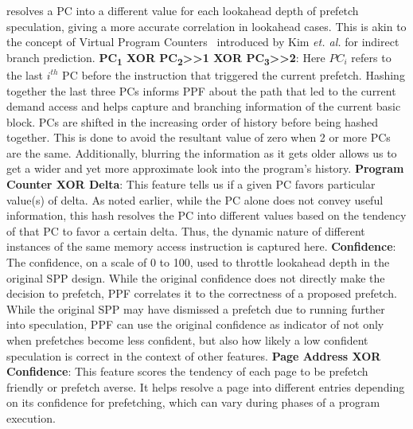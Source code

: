 resolves a PC into a different value for each lookahead depth of
prefetch speculation, giving a more accurate correlation in lookahead
cases.  This is akin to the concept of Virtual Program
Counters~\cite{VPC} introduced by Kim \textit{et. al.} for indirect
branch prediction.
%
\newline
\newline
\noindent \textbf{PC\textsubscript{1} XOR PC\textsubscript{2}>>1 XOR
  PC\textsubscript{3}>>2}: Here $PC_i$ refers to the last $i^{th}$ PC
before the instruction that triggered the current prefetch.  Hashing
together the last three PCs informs PPF about the path that led to the
current demand access and helps capture and branching information of
the current basic block.  PCs are shifted in the increasing order of
history before being hashed together. This is done to avoid the
resultant value of zero when 2 or more PCs are the same. Additionally,
blurring the information as it gets older allows us to get a wider and
yet more approximate look into the program's history.
%
\newline
\newline
\noindent \textbf{Program Counter XOR Delta}: This feature tells us if
a given PC favors particular value(s) of delta.  As noted earlier,
while the PC alone does not convey useful information, this hash
resolves the PC into different values based on the tendency of that PC
to favor a certain delta.  Thus, the dynamic nature of different
instances of the same memory access instruction is captured here.
%
\newline
\newline
\noindent \textbf{Confidence}: The confidence, on a scale of 0 to 100,
used to throttle lookahead depth in the original SPP design.  While
the original confidence does not directly make the decision to
prefetch, PPF correlates it to the correctness of a proposed prefetch.
While the original SPP may have dismissed a prefetch due to running
further into speculation, PPF can use the original confidence as
indicator of not only when prefetches become less confident, but also
how likely a low confident speculation is correct in the context of
other features.
%
\newline
\newline
\noindent \textbf{Page Address XOR Confidence}: This feature scores
the tendency of each page to be prefetch friendly or prefetch averse.
It helps resolve a page into different entries depending on its
confidence for prefetching, which can vary during phases of a program
execution.
